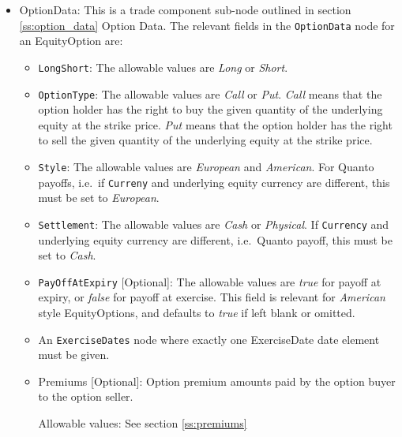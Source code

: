 \begin{itemize}
	\item OptionData: This is a trade component sub-node outlined in section \ref{ss:option_data} Option Data. The relevant fields in the \lstinline!OptionData! node for an EquityOption are:

	
	\begin{itemize}
	\item \lstinline!LongShort!: The allowable values are \emph{Long} or \emph{Short}.

	\item \lstinline!OptionType!: The allowable values are \emph{Call} or \emph{Put}.  \emph{Call} means that the option holder has the right to buy the given quantity of the underlying equity at the strike price.  \emph{Put} means that the option holder has the right to sell the given quantity of the underlying equity at the strike price. 
	
\item  \lstinline!Style!: The allowable values are \emph{European} and \emph{American}. For Quanto payoffs, i.e.\ if \lstinline!Curreny! and underlying equity currency are different, this must be set to \emph{European}.

\item  \lstinline!Settlement!: The allowable values are \emph{Cash} or \emph{Physical}. If
\lstinline!Currency! and underlying equity currency are different, i.e.\ Quanto payoff, this
must be set to \emph{Cash}.

\item \lstinline!PayOffAtExpiry! [Optional]: The allowable values are \emph{true} for payoff at expiry, or \emph{false} for payoff at exercise. This field is relevant for \emph{American} style EquityOptions, and defaults to \emph{true} if left blank or omitted. 

\item An \lstinline!ExerciseDates! node where exactly one ExerciseDate date element must be given. 

\item Premiums [Optional]: Option premium amounts paid by the option buyer to the option seller.

Allowable values:  See section \ref{ss:premiums}

\end{itemize}
	


\end{itemize}

